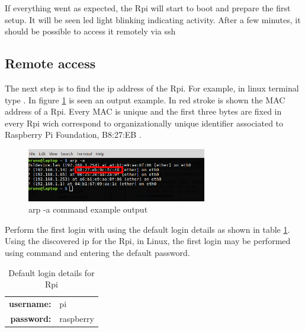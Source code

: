 If everything went as expected, the \gls{Rpi} will start to boot and prepare the first setup. It will be seen led light blinking indicating activity. After a few minutes, it should be possible to access it remotely via ssh


\subsection{Remote access}
The next step is to find the ip address of the \gls{Rpi}. For example, in linux terminal type . In figure \ref{arp_example} is seen an output example. In red stroke is shown the \gls{MAC} address of a \gls{Rpi}. Every \gls{MAC} is unique and the first three bytes are fixed in every \gls{Rpi} wich correspond to organizationally unique identifier \cite{mac_wiki} associated to Raspberry Pi Foundation, B8:27:EB \cite{wireshark_mac}.

\begin{figure}[hb]
	\centering
	\includegraphics[width=0.7\textwidth]{figures/arp_example}
	\caption{arp -a command example output}
	\label{arp_example}
\end{figure}

Perform the first login with using the default login details as shown in table \ref{tab:default_login}.
Using the discovered ip for the \gls{Rpi}, in Linux, the first login  may be performed using  command and entering the default password.

\begin{table}[!h]
	\centering
	\begin{tabular}{rl}
		\toprule
		\textbf{username:}& pi\\
		\textbf{password:}& raspberry\\
		\bottomrule
	\end{tabular}
	\caption{Default login details for \gls{Rpi}}
	\label{tab:default_login}
\end{table}

